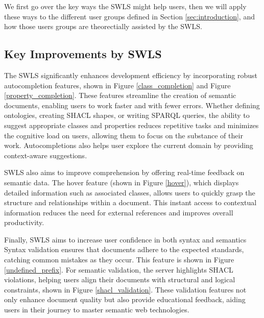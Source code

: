 We first go over the key ways the SWLS might help users, then we will apply these ways to the different user groups defined in Section \ref{sec:introduction}, 
and how those users groups are theorectially assisted by the SWLS.

\subsection{Key Improvements by SWLS}

The SWLS significantly enhances development efficiency by incorporating robust autocompletion features, shown in Figure \ref{class_completion} and Figure \ref{property_completion}.
These features streamline the creation of semantic documents, enabling users to work faster and with fewer errors. 
Whether defining ontologies, creating SHACL shapes, or writing SPARQL queries, the ability to suggest appropriate classes and properties reduces repetitive tasks and minimizes the cognitive load on users, allowing them to focus on the substance of their work.
Autocompletions also helps user explore the current domain by providing context-aware suggestions.

SWLS also aims to improve comprehension by offering real-time feedback on semantic data.
The hover feature (shown in Figure \ref{hover}), which displays detailed information such as associated classes, allows users to quickly grasp the structure and relationships within a document. 
This instant access to contextual information reduces the need for external references and improves overall productivity.

Finally, SWLS aims to increase user confidence in both syntax and semantics
Syntax validation ensures that documents adhere to the expected standards, catching common mistakes as they occur. This feature is shown in Figure \ref{undefined_prefix}.
For semantic validation, the server highlights SHACL violations, helping users align their documents with structural and logical constraints, shown in Figure \ref{shacl_validation}. 
These validation features not only enhance document quality but also provide educational feedback, aiding users in their journey to master semantic web technologies.

